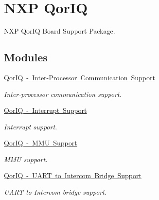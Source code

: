 \hypertarget{group__RTEMSBSPsPowerPCQorIQ}{}\section{N\+XP Qor\+IQ}
\label{group__RTEMSBSPsPowerPCQorIQ}


N\+XP Qor\+IQ Board Support Package.  


\subsection*{Modules}
\begin{DoxyCompactItemize}
\item 
\mbox{\hyperlink{group__QorIQInterCom}{Qor\+I\+Q -\/ Inter-\/\+Processor Communication Support}}
\begin{DoxyCompactList}\small\item\em Inter-\/processor communication support. \end{DoxyCompactList}\item 
\mbox{\hyperlink{group__RTEMSBSPsPowerPCQorIQInterrupt}{Qor\+I\+Q -\/ Interrupt Support}}
\begin{DoxyCompactList}\small\item\em Interrupt support. \end{DoxyCompactList}\item 
\mbox{\hyperlink{group__QorIQMMU}{Qor\+I\+Q -\/ M\+M\+U Support}}
\begin{DoxyCompactList}\small\item\em M\+MU support. \end{DoxyCompactList}\item 
\mbox{\hyperlink{group__QorIQUartBridge}{Qor\+I\+Q -\/ U\+A\+R\+T to Intercom Bridge Support}}
\begin{DoxyCompactList}\small\item\em U\+A\+RT to Intercom bridge support. \end{DoxyCompactList}\end{DoxyCompactItemize}
